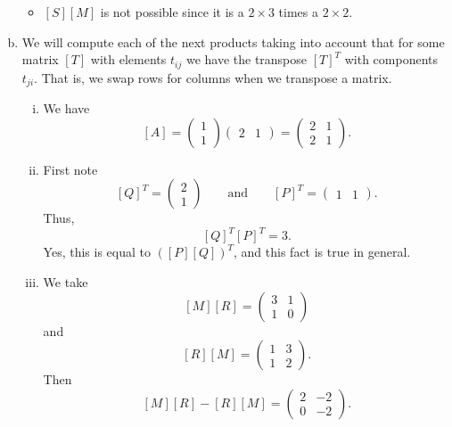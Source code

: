 \documentclass[12pt]{article} %
\begin{document}
\begin{solution}
\begin{enumerate}[(a)]
\begin{itemize}
\[            \]
            \item $[S][M]$ is not possible since it is a $2\times 3$ times a $2 \times 2$.
        \end{itemize}
        \item We will compute each of the next products taking into account that for some matrix $[T]$ with elements $t_{ij}$ we have the transpose $[T]^T$ with components $t_{ji}$. That is, we swap rows for columns when we transpose a matrix.
        \begin{enumerate}[i.]
            \item We have
            \[
                [A] = \begin{pmatrix} 1 \\ 1 \end{pmatrix} \begin{pmatrix} 2 & 1 \end{pmatrix} = \begin{pmatrix} 2 & 1 \\ 2 & 1 \end{pmatrix}.
            \]
            \item First note
            \[
            [Q]^T = \begin{pmatrix} 2 \\ 1 \end{pmatrix} \qquad \textrm{and} \qquad [P]^T = \begin{pmatrix}  1 & 1 \end{pmatrix}.
            \]
            Thus,
            \[
                [Q]^T [P]^T = 3.
            \]
            Yes, this is equal to $([P][Q])^T$, and this fact is true in general.
            \item We take
            \[
            [M][R] = \begin{pmatrix} 3 & 1 \\ 1 & 0 \end{pmatrix} 
            \]
            and
            \[
            [R][M] = \begin{pmatrix} 1 & 3 \\ 1 & 2 \end{pmatrix}.
            \]
            Then
            \[
            [M][R] - [R][M] = \begin{pmatrix} 2 & -2 \\ 0 & -2 \end{pmatrix}.
            \]
        \end{enumerate}
    \end{enumerate}
\end{solution}
\end{document}
